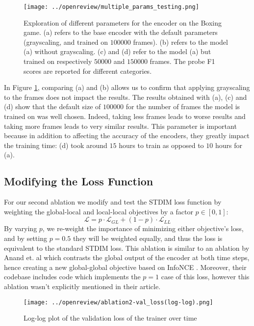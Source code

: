 \begin{figure}[h]
    \centering
    \texttt{[image: ../openreview/multiple\_params\_testing.png]}
    \caption{Exploration of different parameters for the encoder on the Boxing game. (a) refers to the base encoder with the default parameters (grayscaling, and trained on $100000$ frames). (b) refers to the model (a) without grayscaling. (c) and (d) refer to the model (a) but trained on respectively $50000$ and $150000$ frames. The probe F1 scores are reported for different categories.}
    \label{fig:multiple_params}
\end{figure}

In Figure \ref{fig:multiple_params}, comparing (a) and (b) allows us to confirm that applying grayscaling to the frames does not impact the results. The results obtained with (a), (c) and (d) show that the default size of $100000$ for the number of frames the model is trained on was well chosen. Indeed, taking less frames leads to worse results and taking more frames leads to very similar results. This parameter is important because in addition to affecting the accuracy of the encoders, they greatly impact the training time: (d) took around $15$ hours to train as opposed to $10$ hours for (a).

\subsection{Modifying the Loss Function}
For our second ablation we modify and test the STDIM loss function by weighting the global-local and local-local objectives by a factor $p\in \left[0, 1\right]$:
\begin{equation}
\mathcal{L}=p\cdot\mathcal{L}_{GL}+(1-p)\cdot\mathcal{L}_{LL}
\end{equation}
By varying $p$, we re-weight the importance of minimizing either objective's loss, and by setting $p=0.5$ they will be weighted equally, and thus the loss is equivalent to the standard STDIM loss. This ablation is similar to an ablation by Anand et. al which contrasts the global output of the encoder at both time steps, hence creating a new global-global objective based on InfoNCE \cite{main_article}. Moreover, their codebase includes code which implements the $p=1$ case of this loss, however this ablation wasn't explicitly mentioned in their article.

\begin{figure}[H]
    \centering
    \texttt{[image: ../openreview/ablation2-val\_loss(log-log).png]}
    \caption{Log-log plot of the validation loss of the trainer over time}
    \label{fig:ablation2-loss}
\end{figure}

